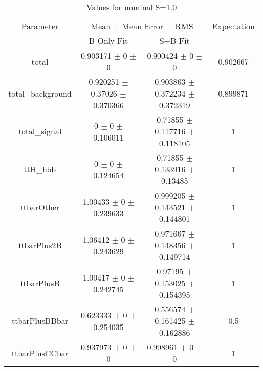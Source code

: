 \begin{table}
\centering
\caption{Values for nominal S=1.0}
\begin{tabular}{cccc}
\toprule
Parameter & \multicolumn{2}{c}{Mean $\pm$ Mean Error $\pm$ RMS} & Expectation\\
 & B-Only Fit & S+B Fit & \\
\midrule
total & \num{0.903171} $\pm$ \num{0} $\pm$ \num{0} & \num{0.900424} $\pm$ \num{0} $\pm$ \num{0} & \num{0.902667}\\
total\_background & \num{0.920251} $\pm$ \num{0.37026} $\pm$ \num{0.370366} & \num{0.903863} $\pm$ \num{0.372234} $\pm$ \num{0.372319} & \num{0.899871}\\
total\_signal & \num{0} $\pm$ \num{0} $\pm$ \num{0.106011} & \num{0.71855} $\pm$ \num{0.117716} $\pm$ \num{0.118105} & \num{1}\\
ttH\_hbb & \num{0} $\pm$ \num{0} $\pm$ \num{0.124654} & \num{0.71855} $\pm$ \num{0.133916} $\pm$ \num{0.13485} & \num{1}\\
ttbarOther & \num{1.00433} $\pm$ \num{0} $\pm$ \num{0.239633} & \num{0.999205} $\pm$ \num{0.143521} $\pm$ \num{0.144801} & \num{1}\\
ttbarPlus2B & \num{1.06412} $\pm$ \num{0} $\pm$ \num{0.243629} & \num{0.971667} $\pm$ \num{0.148356} $\pm$ \num{0.149714} & \num{1}\\
ttbarPlusB & \num{1.00417} $\pm$ \num{0} $\pm$ \num{0.242745} & \num{0.97195} $\pm$ \num{0.153025} $\pm$ \num{0.154395} & \num{1}\\
ttbarPlusBBbar & \num{0.623333} $\pm$ \num{0} $\pm$ \num{0.254035} & \num{0.556574} $\pm$ \num{0.161425} $\pm$ \num{0.162886} & \num{0.5}\\
ttbarPlusCCbar & \num{0.937973} $\pm$ \num{0} $\pm$ \num{0} & \num{0.998961} $\pm$ \num{0} $\pm$ \num{0} & \num{1}\\
\bottomrule
\end{tabular}
\end{table}